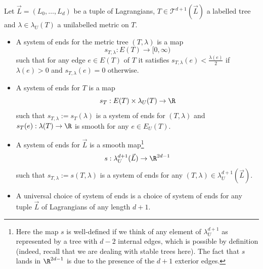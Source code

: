\begin{dfn} Let $\vec{L}=(L_0,\ldots, L_d)$ be a tuple of Lagrangians, $T\in \mathcal{T}^{d+1}(\vec{L})$ a labelled tree and $\lambda\in \lambda_U(T)$ a unilabelled metric on $T$.
	\begin{itemize}
		\item A system of ends for the metric tree $(T,\lambda)$ is a map $$s_{T,\lambda}: E(T)\to [0,\infty)$$ such that for any edge $e\in E(T)$ of $T$ it satisfies $s_{T,\lambda}(e)<\frac{\lambda(e)}{2}$ if $\lambda(e)>0$ and $s_{T,\lambda}(e)=0$ otherwise.
		\item  A system of ends for $T$ is a map $$s_T: E(T)\times \lambda_U(T)\to \R$$ such that $s_{T,\lambda}:=s_T(\lambda)$ is a system of ends for $(T,\lambda)$ and $s_T(e):\lambda(T)\to \R$ is smooth for any $e\in E_U(T)$.
		\item A system of ends for $\vec{L}$ is a smooth map\footnote{Here the map $s$ is well-defined if we think of any element of $\lambda_U^{d+1}$ as represented by a tree with $d-2$ internal edges, which is possible by definition (indeed, recall that we are dealing with stable trees here). The fact that $s$ lands in $\R^{2d-1}$ is due to the presence of the $d+1$ exterior edges.} $$s: \lambda^{d+1}_U(\vec{L})\to \R^{2d-1}$$ such that $s_{T,\lambda}:=s(T,\lambda)$ is a system of ends for any $(T,\lambda)\in \lambda^{d+1}_U(\vec{L})$.
		\item A universal choice of system of ends is a choice of system of ends for any tuple $\vec{L}$ of Lagrangians of any length $d+1$.
	\end{itemize}
\end{dfn}

